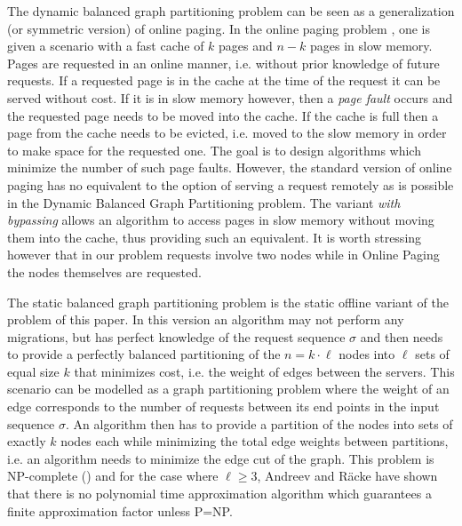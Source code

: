 \documentclass[a4paper,UKenglish,cleveref, autoref, thm-restate,authorcolumns]{lipics-v2019}
\begin{document}
The dynamic balanced graph partitioning problem 
can be seen as a generalization (or symmetric version) of online paging.
In the online paging problem \cite{Fiat2002}, \cite{Epstein2011}
 one is given a scenario with a fast cache of $k$ pages and $n-k$ pages in slow memory. Pages are requested in an online manner, i.e. without prior knowledge of future requests. If a requested page is in the cache at the time of the request it can be served without cost. If it is in slow memory however, then a \textit{page fault} occurs and the requested page needs to be moved into the cache. If the cache is full then a page from the cache needs to be evicted, i.e. moved to the slow memory in order to make space for the requested one. The goal is to design algorithms which minimize the number of such page faults.
However, the standard version of online paging has no equivalent to the option of serving a request remotely as is possible in the Dynamic Balanced Graph Partitioning problem. The variant \textit{with bypassing} allows an algorithm to access pages in slow memory without moving them into the cache, thus providing such an equivalent. It is worth stressing however that in our problem requests involve two nodes while in Online Paging the nodes themselves are requested.

The static balanced graph partitioning problem is the static offline variant of the problem of this paper. In this version an algorithm may not perform any migrations, but has perfect knowledge of the request sequence $\sigma$ and then needs to provide a perfectly balanced partitioning of the $n=k\cdot \ell$ nodes into $\ell$ sets of equal size $k$ that minimizes cost, i.e. the weight of edges between the servers. This scenario can be modelled as a graph partitioning problem where the weight of an edge corresponds to the number of requests between its end points in the input sequence $\sigma$. 
An algorithm then has to provide a partition of the nodes into sets of exactly $k$ nodes each while minimizing the total edge weights between partitions, i.e. an algorithm needs to minimize the edge cut of the graph.  
This problem is NP-complete (\cite{Andreev2006}) and for the case where $\ell\geq 3$, Andreev and R\"acke \cite{Andreev2006} have shown that there is no polynomial time approximation algorithm which guarantees a finite approximation factor unless P=NP.
\end{document}
